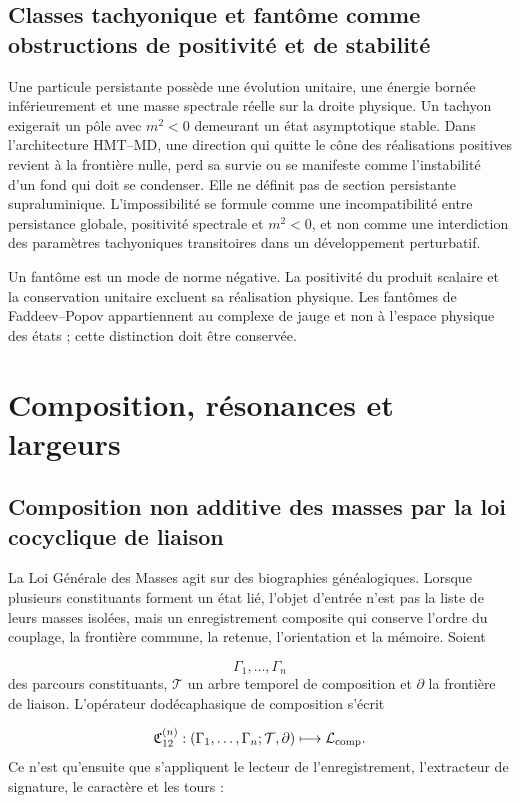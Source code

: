 \subsection{Classes tachyonique et fantôme comme obstructions de positivité et de stabilité}
Une particule persistante possède une évolution unitaire, une énergie bornée inférieurement et une masse spectrale réelle sur la droite physique. Un tachyon exigerait un pôle avec \(m^2<0\) demeurant un état asymptotique stable. Dans l'architecture HMT--MD, une direction qui quitte le cône des réalisations positives revient à la frontière nulle, perd sa survie ou se manifeste comme l'instabilité d'un fond qui doit se condenser. Elle ne définit pas de section persistante supraluminique. L'impossibilité se formule comme une incompatibilité entre persistance globale, positivité spectrale et \(m^2<0\), et non comme une interdiction des paramètres tachyoniques transitoires dans un développement perturbatif.

Un fantôme est un mode de norme négative. La positivité du produit scalaire et la conservation unitaire excluent sa réalisation physique. Les fantômes de Faddeev--Popov appartiennent au complexe de jauge et non à l'espace physique des états ; cette distinction doit être conservée.

\section{Composition, résonances et largeurs}
\subsection{Composition non additive des masses par la loi cocyclique de liaison}
La Loi Générale des Masses agit sur des biographies généalogiques. Lorsque plusieurs constituants forment un état lié, l'objet d'entrée n'est pas la liste de leurs masses isolées, mais un enregistrement composite qui conserve l'ordre du couplage, la frontière commune, la retenue, l'orientation et la mémoire. Soient

\[
\Gamma_1,\ldots,\Gamma_n
\]
des parcours constituants, \(\mathcal T\) un arbre temporel de composition et \(\partial\) la frontière de liaison. L'opérateur dodécaphasique de composition s'écrit

\[
\mathfrak C_{12}^{(n)}:
(\Gamma_1,\ldots,\Gamma_n;\mathcal T,\partial)
\longmapsto \mathcal L_{\rm comp}.
\]
Ce n'est qu'ensuite que s'appliquent le lecteur de l'enregistrement, l'extracteur de signature, le caractère et les tours :

